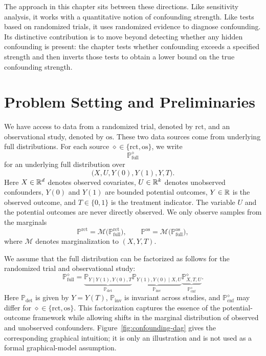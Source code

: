 The approach in this chapter sits between these directions. Like sensitivity analysis, it works with a quantitative notion of confounding strength. Like tests based on randomized trials, it uses randomized evidence to diagnose confounding. Its distinctive contribution is to move beyond detecting whether any hidden confounding is present: the chapter tests whether confounding exceeds a specified strength and then inverts those tests to obtain a lower bound on the true confounding strength.

\section{Problem Setting and Preliminaries}
\label{sec:confounding-setting}

We have access to data from a randomized trial, denoted by \(\mathrm{rct}\), and an observational study, denoted by \(\mathrm{os}\). These two data sources come from underlying full distributions. For each source \(\diamond \in \{\mathrm{rct},\mathrm{os}\}\), we write
\[
  \mathbb{P}^{\diamond}_{\mathrm{full}}
\]
for an underlying full distribution over
\[
  \bigl(X,U,Y(0),Y(1),Y,T\bigr).
\]
Here \(X \in \mathbb{R}^d\) denotes observed covariates, \(U \in \mathbb{R}^k\) denotes unobserved confounders, \(Y(0)\) and \(Y(1)\) are bounded potential outcomes, \(Y \in \mathbb{R}\) is the observed outcome, and \(T \in \{0,1\}\) is the treatment indicator. The variable \(U\) and the potential outcomes are never directly observed. We only observe samples from the marginals
\[
  \mathbb{P}^{\mathrm{rct}}
  =
  \mathcal{M}\bigl(\mathbb{P}^{\mathrm{rct}}_{\mathrm{full}}\bigr),
  \qquad
  \mathbb{P}^{\mathrm{os}}
  =
  \mathcal{M}\bigl(\mathbb{P}^{\mathrm{os}}_{\mathrm{full}}\bigr),
\]
where \(\mathcal{M}\) denotes marginalization to \((X,Y,T)\).

We assume that the full distribution can be factorized as follows for the randomized trial and observational study:
\begin{equation}
\label{eq:confounding-factorization}
  \mathbb{P}^{\diamond}_{\mathrm{full}}
  =
  \underbrace{\mathbb{P}_{Y\mid Y(1),Y(0),T}}_{\mathbb{P}_{\mathrm{det}}}
  \underbrace{\mathbb{P}_{Y(1),Y(0)\mid X,U}}_{\mathbb{P}_{\mathrm{inv}}}
  \underbrace{\mathbb{P}^{\diamond}_{X,T,U}}_{\mathbb{P}^{\diamond}_{\mathrm{cnf}}}.
\end{equation}
Here \(\mathbb{P}_{\mathrm{det}}\) is given by \(Y=Y(T)\), \(\mathbb{P}_{\mathrm{inv}}\) is invariant across studies, and \(\mathbb{P}^{\diamond}_{\mathrm{cnf}}\) may differ for \(\diamond \in \{\mathrm{rct},\mathrm{os}\}\). This factorization captures the essence of the potential-outcome framework while allowing shifts in the marginal distribution of observed and unobserved confounders. Figure~\ref{fig:confounding-dag} gives the corresponding graphical intuition; it is only an illustration and is not used as a formal graphical-model assumption.

